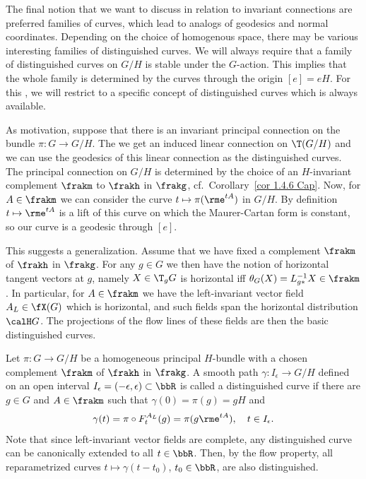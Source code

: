 The final notion that we want to discuss in relation to invariant connections are preferred families of curves, which lead to analogs of geodesics and normal coordinates. Depending on the choice of homogenous space, there may be various interesting families of distinguished curves. We will always require that a family of distinguished curves on $G\slash H$ is stable under the $G$-action. This implies that the whole family is determined by the curves through the origin $[e]=eH$. For this \subsect, we will restrict to a specific concept of distinguished curves which is always available.

As motivation, suppose that there is an invariant principal connection on the bundle $\pi:G\to G\slash H$. The we get an induced linear connection on $\T(G\slash H)$ and we can use the geodesics of this linear connection as the distinguished curves. The principal connection on $G\slash H$ is determined by the choice of an $H$-invariant complement $\frakm$ to $\frakh$ in $\frakg$, cf.\ Corollary~\ref{cor 1.4.6 Cap}. Now, for $A\in\frakm$ we can consider the curve $t\mapsto \pi(\rme^{tA})$ in $G\slash H$. By definition $t\mapsto \rme^{tA}$ is a lift of this curve on which the Maurer-Cartan form is constant, so our curve is a geodesic through $[e]$.

This suggests a generalization. Assume that we have fixed a complement $\frakm$ of $\frakh$ in $\frakg$. For any $g\in G$ we then have the notion of horizontal tangent vectors at $g$, namely $X\in \T_g G$ is horizontal iff $\theta_G(X)=L_{g\ast}^{-1}X\in\frakm$. In particular, for $A\in\frakm$ we have the left-invariant vector field $A_L\in\fX(G)$ which is horizontal, and such fields span the horizontal distribution $\calH G$. The projections of the flow lines of these fields are then the basic distinguished curves.

\begin{defn}
    Let $\pi:G\to G\slash H$ be a homogeneous principal $H$-bundle with a chosen complement $\frakm$ of $\frakh$ in $\frakg$. A smooth path $\gamma:I_\epsilon\to G\slash H$ defined on an open interval $I_\epsilon=(-\epsilon,\epsilon)\subset \bbR$ is called a distinguished curve if there are $g\in G$ and $A\in\frakm$ such that $\gamma(0)=\pi(g)=gH$ and 
    \[\gamma(t)=\pi\circ F^{A_L}_t(g)=\pi(g\rme^{tA}),\quad t\in I_\epsilon.\]
    Note that since left-invariant vector fields are complete, any distinguished curve can be canonically extended to all $t\in \bbR$. Then, by the flow property, all reparametrized curves $t\mapsto \gamma(t-t_0)$, $t_0\in\bbR$, are also distinguished.
\end{defn}



